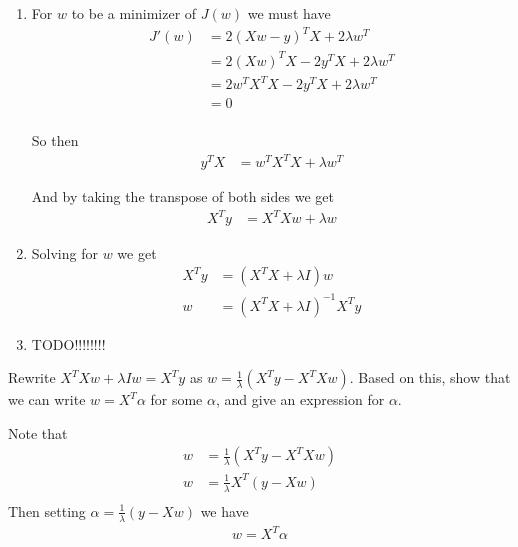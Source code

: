 \documentclass[12pt,letterpaper]{article}
\begin{document}
\begin{solution}{}
$\,$
\newline
\begin{enumerate}
    \item For $w$ to be a minimizer of $J(w)$ we must have 
    \begin{align*}
        J'(w) &= 2(Xw-y)^TX + 2\lambda w^T\\
        &= 2(Xw)^TX - 2y^TX + 2\lambda w^T\\
        &= 2w^TX^TX - 2y^TX + 2\lambda w^T\\
        &= 0\\
    \end{align*}
    
    So then 
    \begin{align*}
        y^TX &= w^TX^TX + \lambda w^T
    \end{align*}
    
    And by taking the transpose of both sides we get 
    \begin{align*}
        X^Ty &= X^TXw + \lambda w
    \end{align*}
    
    \item Solving for $w$ we get
    \begin{align*}
        X^Ty &= (X^TX + \lambda I)w\\
        w &= (X^TX + \lambda I)^{-1}X^Ty
    \end{align*}
    
    \item TODO!!!!!!!!
\end{enumerate}
\end{solution}
\newpage

\begin{problem}{3.2}
    Rewrite $X^{T}Xw+\lambda Iw=X^{T}y$ as $w=\frac{1}{\lambda}(X^{T}y-X^{T}Xw)$.
    Based on this, show that we can write $w=X^{T}\alpha$ for some $\alpha$,
    and give an expression for $\alpha$.
\end{problem}
\begin{solution}{}
    Note that
    \begin{align*}
        w &= \frac{1}{\lambda} (X^Ty - X^TXw)\\
        w &= \frac{1}{\lambda}X^T(y-Xw)\\
    \end{align*}
    Then setting $\alpha = \frac{1}{\lambda}(y-Xw)$ we have
    \begin{align*}
        w=X^{T}\alpha
    \end{align*}
\end{solution}
\newpage
\end{document}
